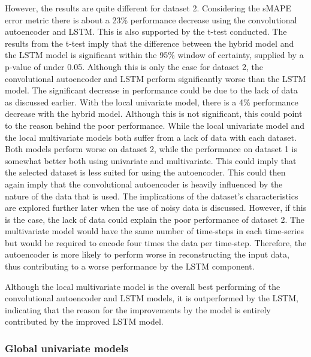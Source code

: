 However, the results are quite different for dataset 2.
Considering the sMAPE error metric there is about a 23\% performance decrease using the convolutional autoencoder and LSTM.
This is also supported by the t-test conducted. The results from the t-test imply that the difference between the hybrid model and the LSTM model
is significant within the 95\% window of certainty, supplied by a p-value of under 0.05.
Although this is only the case for dataset 2, the convolutional autoencoder and LSTM perform significantly worse than the LSTM model.
The significant decrease in performance could be due to the lack of data as discussed earlier.
With the local univariate model, there is a 4\% performance decrease with the hybrid model.
Although this is not significant, this could point to the reason behind the poor performance.
While the local univariate model and the local multivariate models both suffer from a lack of data with each dataset.
Both models perform worse on dataset 2, while the performance on dataset 1 is somewhat better both using univariate and multivariate.
This could imply that the selected dataset is less suited for using the autoencoder.
This could then again imply that the convolutional autoencoder is heavily influenced by the nature of the data that is used.
The implications of the dataset's characteristics are explored further later when the use of noisy data is discussed.
However, if this is the case, the lack of data could explain the poor performance of dataset 2.
The multivariate model would have the same number of time-steps in each time-series but would be required to encode four times the data per time-step.
Therefore, the autoencoder is more likely to perform worse in reconstructing the input data,
thus contributing to a worse performance by the LSTM component.


Although the local multivariate model is the overall best performing of the convolutional autoencoder and LSTM models,
it is outperformed by the LSTM, indicating that the reason for the improvements by the model
is entirely contributed by the improved LSTM model.


\subsubsection{Global univariate models}


